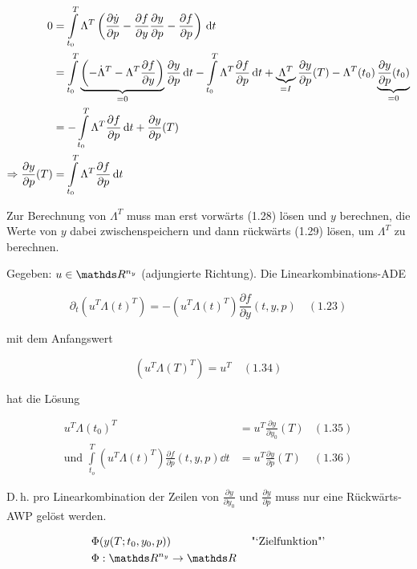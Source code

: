 \begin{align*}
0 &= \int\limits_{t_0}^T \Lambda^T \left( \frac{\partial \dot y}{\partial p} - \frac{\partial f}{\partial y} \frac{\partial y}{\partial p} - \frac{\partial f}{\partial p} \right) \,\mathrm d t \\
&= \int\limits_{t_0}^T \underbrace{\left( -\dot \Lambda^T - \Lambda^T \frac{\partial f}{\partial y} \right)}_{= 0} \frac{\partial y}{\partial p} \,\mathrm d t - \int\limits_{t_0}^T \Lambda^T \frac{\partial f}{\partial p} \,\mathrm d t + \underbrace{\Lambda^T}_{=I} \frac{\partial y}{\partial p}(T) - \Lambda^T(t_0) \underbrace{\frac{\partial y}{\partial p}(t_0)}_{=0} \\
&= -\int\limits_{t_0}^T \Lambda^T \frac{\partial f}{\partial p} \,\mathrm d t + \frac{\partial y}{\partial p} (T) \\
\Rightarrow \frac{\partial y}{\partial p} (T) &= \int\limits_{t_0}^T \Lambda^T \frac{\partial f}{\partial p} \,\mathrm d t
\end{align*}


Zur Berechnung von $\Lambda^T$ muss man erst vorwärts (1.28) lösen und $y$ berechnen, die Werte von $y$ dabei zwischenspeichern und dann rückwärts (1.29) lösen, um $\Lambda^T$ zu berechnen.


Gegeben: $u\in\R^{n_y}$ (adjungierte Richtung). Die Linearkombinations-ADE

\[ \partial_t (u^T \Lambda(t)^T) = - (u^T \Lambda (t)^T) \frac{\partial f}{\partial y} (t,y,p) \quad (1.23) \]

mit dem Anfangswert

\[ (u^T \Lambda(T)^T) = u^T \quad (1.34) \]

hat die Lösung

\begin{align*}
u^T \Lambda(t_0)^T &= u^T \frac{\partial y}{\partial y_0} (T) & (1.35) \\
\text{und } \int\limits_{t_o}^T (u^T \Lambda(t)^T) \frac{\partial f}{\partial p} (t,y,p) \dd t &= u^T \frac{\partial y}{\partial p} (T) & (1.36)
\end{align*}

D.\,h. pro Linearkombination der Zeilen von $\tfrac{\partial y}{\partial y_0}$ und $\tfrac{\partial y}{\partial p}$ muss nur eine Rückwärts-AWP gelöst werden.


\begin{align*}
& \Phi(y(T; t_0, y_0, p)) & & \text{ "`Zielfunktion"'} \\
& \Phi: \R^{n_y}  \to \R
\end{align*}

